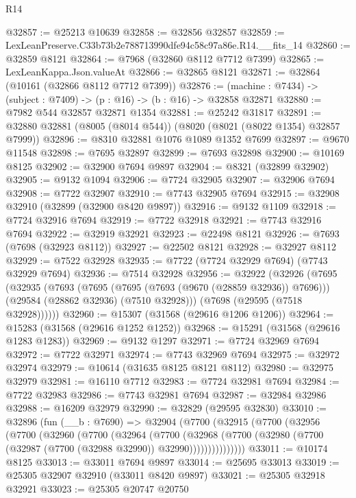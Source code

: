 \begin{lexlean}{R14}
\begin{coremodule}
@32857 := @25213 @10639
@32858 := @32856 @32857
@32859 := LexLeanPreserve.C33b73b2e788713990dfe94c58c97a86e.R14.__fits_14
@32860 := @32859 @8121
@32864 := @7968 (@32860 @8112 @7712 @7399)
@32865 := LexLeanKappa.Json.valueAt
@32866 := @32865 @8121
@32871 := @32864 (@10161 (@32866 @8112 @7712 @7399))
@32876 := (machine : @7434) -> (subject : @7409) -> (p : @16) -> (b : @16) -> @32858 @32871
@32880 := @7982 @544 @32857 @32871 @1354
@32881 := @25242 @31817
@32891 := @32880 @32881 (@8005 (@8014 @544)) (@8020 (@8021 (@8022 @1354) @32857 @7999))
@32896 := @8310 @32881 @1076 @1089 @1352 @7699
@32897 := @9670 @11548
@32898 := @7695 @32897
@32899 := @7693 @32898
@32900 := @10169 @8125
@32902 := @32900 @7694 @9897
@32904 := @8321 (@32899 @32902)
@32905 := @9132 @1094
@32906 := @7724 @32905
@32907 := @32906 @7694
@32908 := @7722 @32907
@32910 := @7743 @32905 @7694
@32915 := @32908 @32910 (@32899 (@32900 @8420 @9897))
@32916 := @9132 @1109
@32918 := @7724 @32916 @7694
@32919 := @7722 @32918
@32921 := @7743 @32916 @7694
@32922 := @32919 @32921
@32923 := @22498 @8121
@32926 := @7693 (@7698 (@32923 @8112))
@32927 := @22502 @8121
@32928 := @32927 @8112
@32929 := @7522 @32928
@32935 := @7722 (@7724 @32929 @7694) (@7743 @32929 @7694)
@32936 := @7514 @32928
@32956 := @32922
    (@32926
      (@7695
        (@32935
          (@7693
            (@7695 (@7695 (@7693 (@9670 (@28859 @32936)) @7696)))
            (@29584 (@28862 @32936) (@7510 @32928)))
          (@7698 (@29595 (@7518 @32928))))))
@32960 := @15307 (@31568 (@29616 @1206 @1206))
@32964 := @15283 (@31568 (@29616 @1252 @1252))
@32968 := @15291 (@31568 (@29616 @1283 @1283))
@32969 := @9132 @1297
@32971 := @7724 @32969 @7694
@32972 := @7722 @32971
@32974 := @7743 @32969 @7694
@32975 := @32972 @32974
@32979 := @10614 (@31635 @8125 @8121 @8112)
@32980 := @32975 @32979
@32981 := @16110 @7712
@32983 := @7724 @32981 @7694
@32984 := @7722 @32983
@32986 := @7743 @32981 @7694
@32987 := @32984 @32986
@32988 := @16209 @32979
@32990 := @32829 (@29595 @32830)
@33010 := @32896
    (fun (__b : @7690) =>
    @32904
      (@7700
        (@32915
          (@7700
            (@32956
              (@7700
                (@32960
                  (@7700
                    (@32964
                      (@7700
                        (@32968
                          (@7700
                            (@32980 (@7700 (@32987 (@7700 (@32988 @32990)) @32990)))))))))))))))
@33011 := @10174 @8125
@33013 := @33011 @7694 @9897
@33014 := @25695 @33013
@33019 := @25305 @32907 @32910 (@33011 @8420 @9897)
@33021 := @25305 @32918 @32921
@33023 := @25305 @20747 @20750

\end{coremodule}
\end{lexlean}
